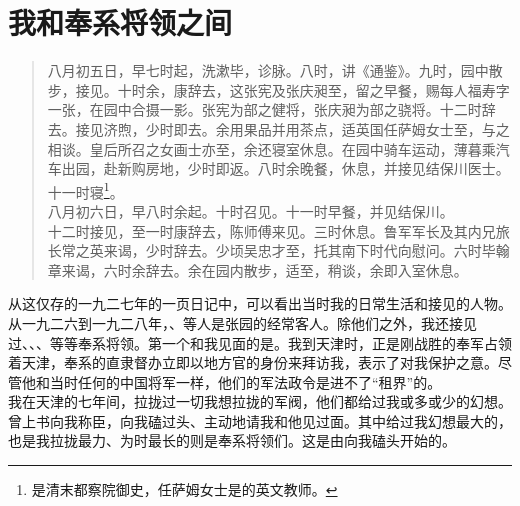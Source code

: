 \fancyhead[RO]{} %
\fancyhead[LE]{} %
\chapter*{我和奉系将领之间}
\thispagestyle{empty}
\begin{quote}
	八月初五日，早七时起，洗漱毕，诊脉。八时，讲《通鉴》。九时，园中散步，接见。十时余，康辞去，这张宪及张庆昶至，留之早餐，赐每人福寿字一张，在园中合摄一影。张宪为部之健将，张庆昶为部之骁将。十二时辞去。接见济煦，少时即去。余用果品并用茶点，适英国任萨姆女士至，与之相谈。皇后所召之女画士亦至，余还寝室休息。在园中骑车运动，薄暮乘汽车出园，赴新购房地，少时即返。八时余晚餐，休息，并接见结保川医士。十一时寝\footnote{是清末都察院御史，任萨姆女士是的英文教师。}。\\

八月初六日，早八时余起。十时召见。十一时早餐，并见结保川。\\

十二时接见，至一时康辞去，陈师傅来见。三时休息。鲁军军长及其内兄旅长常之英来谒，少时辞去。少顷吴忠才至，托其南下时代向慰问。六时毕翰章来谒，六时余辞去。余在园内散步，适至，稍谈，余即入室休息。\\
\end{quote}

从这仅存的一九二七年的一页日记中，可以看出当时我的日常生活和接见的人物。从一九二六到一九二八年，、等人是张园的经常客人。除他们之外，我还接见过、、、等等奉系将领。第一个和我见面的是。我到天津时，正是刚战胜的奉军占领着天津，奉系的直隶督办立即以地方官的身份来拜访我，表示了对我保护之意。尽管他和当时任何的中国将军一样，他们的军法政令是进不了“租界”的。\\

我在天津的七年间，拉拢过一切我想拉拢的军阀，他们都给过我或多或少的幻想。曾上书向我称臣，向我磕过头、主动地请我和他见过面。其中给过我幻想最大的，也是我拉拢最力、为时最长的则是奉系将领们。这是由向我磕头开始的。\\

